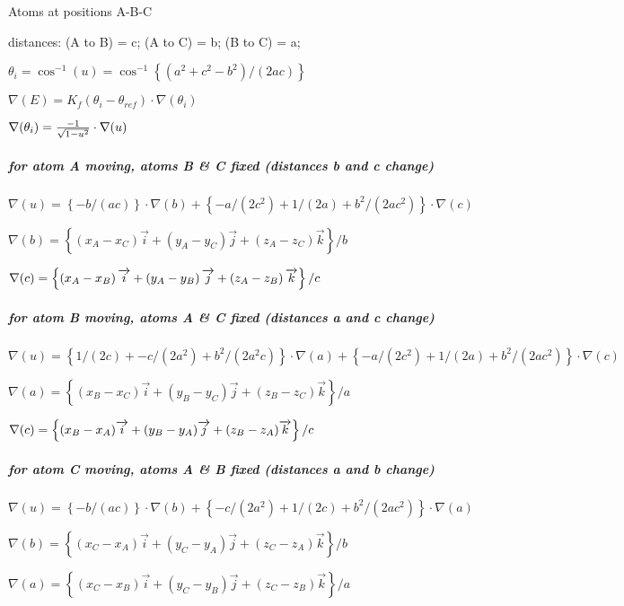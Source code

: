 Atoms at positions A-B-C

distances: (A to B) = c; (A to C) = b; (B to C) = a;

$\theta _{i}=\cos ^{-1}(u)=\cos ^{-1}\left\{ \left( a^{2}+c^{2}-b^{2}\right)
/\left( 2ac\right) \right\} $

$\nabla (E)=K_{f}\left( \theta _{i}-\theta _{ref}\right) \cdot \nabla
(\theta _{i})$

$\nabla (\theta _{i})=\frac{-1}{\sqrt{1-u^{2}}}\cdot \nabla (u)\medskip $

\subparagraph*{for atom A moving, atoms B \& C fixed (distances b and c
change)}

$\nabla (u)=\left\{ -b/\left( ac\right) \right\} \cdot \nabla (b)+\left\{
-a/\left( 2c^{2}\right) +1/\left( 2a\right) +b^{2}/\left( 2ac^{2}\right)
\right\} \cdot \nabla (c)$

$\nabla (b)=\left\{ \left( x_{A}-x_{C}\right) \overrightarrow{i}+\left(
y_{A}-y_{C}\right) \overrightarrow{j}+\left( z_{A}-z_{C}\right) 
\overrightarrow{k}\right\} /b$

$\nabla (c)=\left\{ \left( x_{A}-x_{B}\right) \overrightarrow{i}+\left(
y_{A}-y_{B}\right) \overrightarrow{j}+\left( z_{A}-z_{B}\right) 
\overrightarrow{k}\right\} /c\medskip $

\subparagraph*{for atom B moving, atoms A \& C fixed (distances a and c
change)}

$\nabla (u)=\left\{ 1/(2c)+-c/(2a^{2})+b^{2}/(2a^{2}c)\right\} \cdot \nabla
(a)+\left\{ -a/\left( 2c^{2}\right) +1/(2a)+b^{2}/\left( 2ac^{2}\right)
\right\} \cdot \nabla (c)$

$\nabla (a)=\left\{ (x_{B}-x_{C})\overrightarrow{i}+(y_{B}-y_{C})%
\overrightarrow{j}+(z_{B}-z_{C})\overrightarrow{k}\right\} /a$

$\nabla (c)=\left\{ (x_{B}-x_{A})\overrightarrow{i}+(y_{B}-y_{A})%
\overrightarrow{j}+(z_{B}-z_{A})\overrightarrow{k}\right\} /c\medskip $

\subparagraph*{for atom C moving, atoms A \& B fixed (distances a and b
change)}

$\nabla (u)=\left\{ -b/\left( ac\right) \right\} \cdot \nabla (b)+\left\{
-c/\left( 2a^{2}\right) +1/(2c)+b^{2}/\left( 2ac^{2}\right) \right\} \cdot 
\nabla (a)$

$\nabla (b)=\left\{ (x_{C}-x_{A})\overrightarrow{i}+(y_{C}-y_{A})%
\overrightarrow{j}+(z_{C}-z_{A})\overrightarrow{k}\right\} /b$

$\nabla (a)=\left\{ (x_{C}-x_{B})\overrightarrow{i}+(y_{C}-y_{B})%
\overrightarrow{j}+(z_{C}-z_{B})\overrightarrow{k}\right\} /a $


